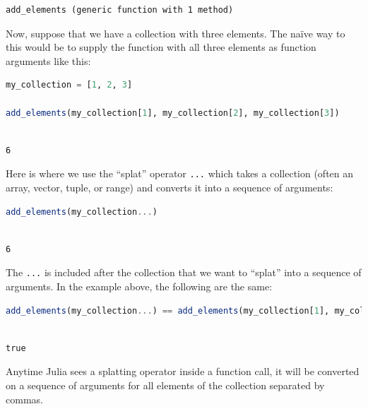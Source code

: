\documentclass[
  notoc %
]{tufte-book}
\newcommand{\passthrough}[1]{#1}
\begin{document}
\begin{lstlisting}[language=Output]
add_elements (generic function with 1 method)
\end{lstlisting}

Now, suppose that we have a collection with three elements. The naïve
way to this would be to supply the function with all three elements as
function arguments like this:

\begin{lstlisting}[language=Julia]
my_collection = [1, 2, 3]

add_elements(my_collection[1], my_collection[2], my_collection[3])
\end{lstlisting}

\begin{lstlisting}[language=Output]

6

\end{lstlisting}

Here is where we use the ``splat'' operator
\passthrough{\lstinline!...!} which takes a collection (often an array,
vector, tuple, or range) and converts it into a sequence of arguments:

\begin{lstlisting}[language=Julia]
add_elements(my_collection...)
\end{lstlisting}

\begin{lstlisting}[language=Output]

6

\end{lstlisting}

The \passthrough{\lstinline!...!} is included after the collection that
we want to ``splat'' into a sequence of arguments. In the example above,
the following are the same:

\begin{lstlisting}[language=Julia]
add_elements(my_collection...) == add_elements(my_collection[1], my_collection[2], my_collection[3])
\end{lstlisting}

\begin{lstlisting}[language=Output]

true

\end{lstlisting}

Anytime Julia sees a splatting operator inside a function call, it will
be converted on a sequence of arguments for all elements of the
collection separated by commas.
\end{document}
